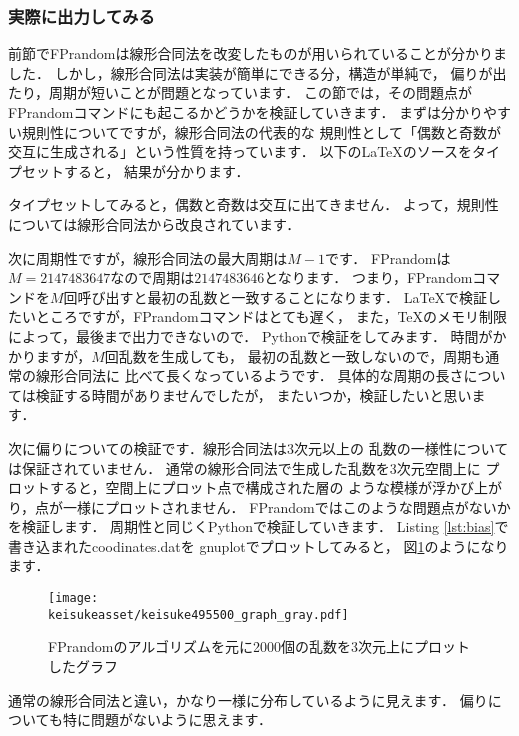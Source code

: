 \subsubsection{実際に出力してみる}
前節でFPrandomは線形合同法を改変したものが用いられていることが分かりました．
しかし，線形合同法は実装が簡単にできる分，構造が単純で，
偏りが出たり，周期が短いことが問題となっています．
この節では，その問題点がFPrandomコマンドにも起こるかどうかを検証していきます．
まずは分かりやすい規則性についてですが，線形合同法の代表的な
規則性として「偶数と奇数が交互に生成される」という性質を持っています．
以下の\LaTeX のソースをタイプセットすると，
結果が分かります．
タイプセットしてみると，偶数と奇数は交互に出てきません．
よって，規則性については線形合同法から改良されています．

次に周期性ですが，線形合同法の最大周期は$M-1$です．
FPrandomは$M=2147483647$なので周期は$2147483646$となります．
つまり，FPrandomコマンドを$M$回呼び出すと最初の乱数と一致することになります．
\LaTeX で検証したいところですが，FPrandomコマンドはとても遅く，
また，\TeX のメモリ制限によって，最後まで出力できないので．
Pythonで検証をしてみます．
時間がかかりますが，$M$回乱数を生成しても，
最初の乱数と一致しないので，周期も通常の線形合同法に
比べて長くなっているようです．
具体的な周期の長さについては検証する時間がありませんでしたが，
またいつか，検証したいと思います．

次に偏りについての検証です．線形合同法は3次元以上の
乱数の一様性については保証されていません．
通常の線形合同法で生成した乱数を3次元空間上に
プロットすると，空間上にプロット点で構成された層の
ような模様が浮かび上がり，点が一様にプロットされません．
FPrandomではこのような問題点がないかを検証します．
周期性と同じくPythonで検証していきます．
\label{lst:bias}
Listing \ref{lst:bias}で書き込まれたcoodinates.datを
gnuplotでプロットしてみると，
図\ref{fig:bias}のようになります．
\begin{figure}[htbp]
  \centering
  \texttt{[image: \\keisukeasset/keisuke495500\_graph\_gray.pdf]}
  \caption{FPrandomのアルゴリズムを元に2000個の乱数を3次元上にプロットしたグラフ}
  \label{fig:bias}
\end{figure}
通常の線形合同法と違い，かなり一様に分布しているように見えます．
偏りについても特に問題がないように思えます．

